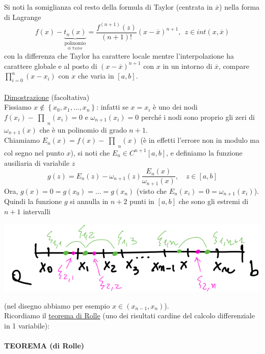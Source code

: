 \documentclass[12pt]{article}
\newcommand{\inter}{\begin{matrix}\prod\end{matrix}}
\begin{document}
Si noti la somiglianza col resto della formula di Taylor (centrata in $\overline{x}$) nella forma di Lagrange
\[ f(x) - \underbrace{t_n(x)}_{\underset{\text{di Taylor}}{\text{polinomio}}} = \frac{f^{(n+1)}(z)}{(n+1)!} (x - \overline{x})^{n+1}, \ \ z \in int(x, \overline{x}) \]
con la differenza che Taylor ha carattere locale mentre l'interpolazione ha carattere globale e al posto di $(x-\overline{x})^{n+1}$ con $x$ in un intorno di $\overline{x}$, compare $\prod_{i=0}^{n} (x-x_i)$ con $x$ che varia in $[a,b]$.\\
\\
\underline{Dimostrazione} (facoltativa)\\
Fissiamo $x \notin \left\{ x_0, x_1, \dots, x_n \right\}$: infatti se $x=x_i$ è uno dei nodi $f(x_i) - \inter_n (x_i) = 0$ e $\omega_{n+1}(x_i)=0$ perché i nodi sono proprio gli zeri di $\omega_{n+1}(x)$ che è un polinomio di grado $n+1$.\\
Chiamiamo $E_n(x) = f(x) - \inter_n (x)$ (è in effetti l'errore non in modulo ma col segno nel punto $x$), si noti che $E_n \in C^{n+1}[a,b]$, e definiamo la funzione ausiliaria di variabile $z$
\[ g(z) = E_n(z) - \omega_{n+1}(z) \frac{E_n(x)}{\omega_{n+1}(x)}, \quad z \in [a,b] \]
Ora, $g(x) = 0 = g(x_0) = \dotso = g(x_n)$ (visto  che $E_n(x_i) = 0 = \omega_{n+1}(x_i)$). Quindi la funzione $g$ si annulla in $n+2$ punti in $[a,b]$ che sono gli estremi di $n+1$ intervalli
\begin{center}
    \includegraphics[scale=0.5]{img1_pag6.png}
\end{center}
(nel disegno abbiamo per esempio $x \in (x_{n-1}, x_n)$).\\
Ricordiamo il \underline{teorema di Rolle} (uno dei risultati cardine del calcolo differenziale in 1 variabile):\\\\
\textbf{TEOREMA (di Rolle)}
\begin{center}
\end{center}
\end{document}
